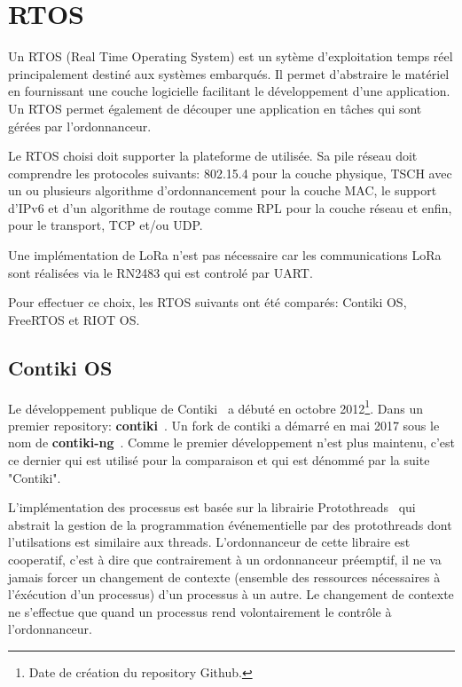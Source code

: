 \section{RTOS}

Un RTOS (Real Time Operating System) est un sytème d'exploitation temps réel principalement destiné aux systèmes embarqués. Il permet d'abstraire le matériel en fournissant une couche logicielle facilitant le développement d'une application. Un RTOS permet également de découper une application en tâches qui sont gérées par l'ordonnanceur.

%

Le RTOS choisi doit supporter la plateforme de utilisée. Sa pile réseau doit comprendre les protocoles suivants: 802.15.4 pour la couche physique, TSCH avec un ou plusieurs algorithme d'ordonnancement pour la couche MAC, le support d'IPv6 et d'un algorithme de routage comme RPL pour la couche réseau et enfin, pour le transport, TCP et/ou UDP.

Une implémentation de LoRa n'est pas nécessaire car les communications LoRa sont réalisées via le 
RN2483 qui est controlé par UART.

Pour effectuer ce choix, les RTOS suivants ont été comparés: Contiki OS, FreeRTOS et RIOT OS.

\subsection*{Contiki OS}\label{subsec:etat_art:rtos:contiki}
    Le développement publique de Contiki~\cite{paper:contiki} a débuté en octobre 2012\footnote{Date de création du repository Github.}. Dans un premier repository: \textbf{contiki}~\cite{contiki-repo:old}. Un fork de contiki a démarré en mai 2017 sous le nom de \textbf{contiki-ng}~\cite{contiki-repo:ng}. Comme le premier développement n'est plus maintenu, c'est ce dernier qui est utilisé pour la comparaison et qui est dénommé par la suite "Contiki".

    L'implémentation des processus est basée sur la librairie Protothreads~\cite{paper:protothreads}
    qui abstrait la gestion de la programmation événementielle par des protothreads dont l'utilsations est similaire aux threads. L'ordonnanceur de cette libraire est cooperatif, c'est à dire que contrairement à un ordonnanceur préemptif, il ne va jamais forcer un changement de contexte (ensemble des ressources nécessaires à l'éxécution d'un processus) d'un processus à un autre. Le changement de contexte ne s'effectue que quand un processus rend volontairement le contrôle à l'ordonnanceur.

